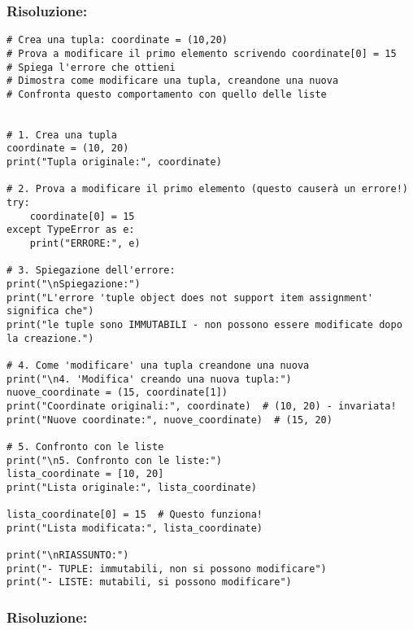 \subsubsection{Risoluzione: }

\begin{lstlisting}
# Crea una tupla: coordinate = (10,20)
# Prova a modificare il primo elemento scrivendo coordinate[0] = 15
# Spiega l'errore che ottieni
# Dimostra come modificare una tupla, creandone una nuova
# Confronta questo comportamento con quello delle liste


# 1. Crea una tupla
coordinate = (10, 20)
print("Tupla originale:", coordinate)

# 2. Prova a modificare il primo elemento (questo causerà un errore!)
try:
    coordinate[0] = 15
except TypeError as e:
    print("ERRORE:", e)

# 3. Spiegazione dell'errore:
print("\nSpiegazione:")
print("L'errore 'tuple object does not support item assignment' significa che")
print("le tuple sono IMMUTABILI - non possono essere modificate dopo la creazione.")

# 4. Come 'modificare' una tupla creandone una nuova
print("\n4. 'Modifica' creando una nuova tupla:")
nuove_coordinate = (15, coordinate[1])
print("Coordinate originali:", coordinate)  # (10, 20) - invariata!
print("Nuove coordinate:", nuove_coordinate)  # (15, 20)

# 5. Confronto con le liste
print("\n5. Confronto con le liste:")
lista_coordinate = [10, 20]
print("Lista originale:", lista_coordinate)

lista_coordinate[0] = 15  # Questo funziona!
print("Lista modificata:", lista_coordinate)

print("\nRIASSUNTO:")
print("- TUPLE: immutabili, non si possono modificare")
print("- LISTE: mutabili, si possono modificare")

\end{lstlisting}


\subsubsection{Risoluzione: }

